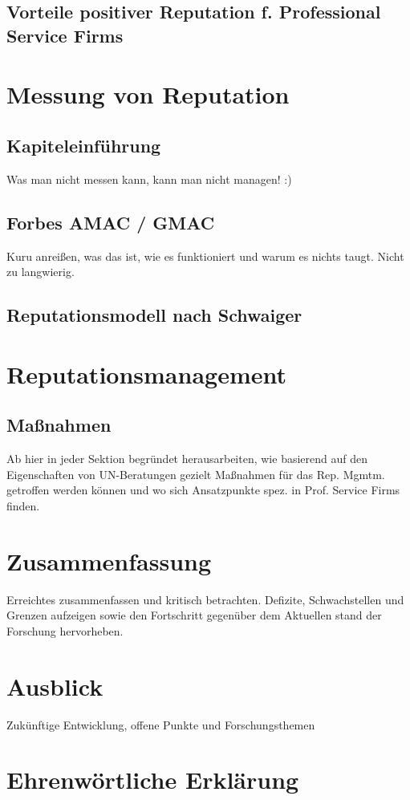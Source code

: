 \documentclass[a4paper,oneside,12pt]{scrreprt}
\begin{document}
\section{Vorteile positiver Reputation f. Professional Service Firms}
\chapter{Messung von Reputation}
\section{Kapiteleinführung}
Was man nicht messen kann, kann man nicht managen! :)
\section{Forbes AMAC / GMAC}
Kuru anreißen, was das ist, wie es funktioniert und warum es nichts taugt. Nicht zu langwierig.
\section{Reputationsmodell nach Schwaiger}

\chapter{Reputationsmanagement}
\section{Maßnahmen}
Ab hier in jeder Sektion begründet herausarbeiten, wie basierend auf den Eigenschaften von UN-Beratungen gezielt Maßnahmen für das Rep. Mgmtm. getroffen werden können und wo sich Ansatzpunkte spez. in Prof. Service Firms finden.
\chapter{Zusammenfassung}
Erreichtes zusammenfassen und kritisch betrachten. Defizite, Schwachstellen und Grenzen aufzeigen sowie den Fortschritt gegenüber dem Aktuellen stand der Forschung hervorheben.
\chapter{Ausblick}
Zukünftige Entwicklung, offene Punkte und Forschungsthemen

\chapter*{Ehrenwörtliche Erklärung}
\hspace*{0.5cm}
\end{document}
